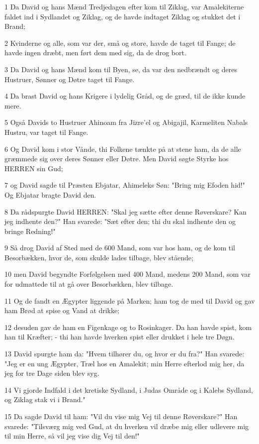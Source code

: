 \par 1 Da David og hans Mænd Tredjedagen efter kom til Ziklag, var Amalekiterne faldet ind i Sydlandet og Ziklag, og de havde indtaget Ziklag og stukket det i Brand;
\par 2 Kvinderne og alle, som var der, små og store, havde de taget til Fange; de havde ingen dræbt, men ført dem med sig, da de drog bort.
\par 3 Da David og hans Mænd kom til Byen, se, da var den nedbrændt og deres Hustruer, Sønner og Døtre taget til Fange.
\par 4 Da brast David og hans Krigere i lydelig Gråd, og de græd, til de ikke kunde mere.
\par 5 Også Davids to Hustruer Ahinoam fra Jizre'el og Abigajil, Karmeliten Nabals Hustru, var taget til Fange.
\par 6 Og David kom i stor Vånde, thi Folkene tænkte på at stene ham, da de alle græmmede sig over deres Sønner eller Døtre. Men David søgte Styrke hos HERREN sin Gud;
\par 7 og David sagde til Præsten Ebjatar, Ahimeleks Søn: "Bring mig Efoden hid!" Og Ebjatar bragte David den.
\par 8 Da rådspurgte David HERREN: "Skal jeg sætte efter denne Røverskare? Kan jeg indhente den?" Han svarede: "Sæt efter den; thi du skal indhente den og bringe Redning!"
\par 9 Så drog David af Sted med de 600 Mand, som var hos ham, og de kom til Besorbækken, hvor de, som skulde lades tilbage, blev stående;
\par 10 men David begyndte Forfølgelsen med 400 Mand, medens 200 Mand, som var for udmattede til at gå over Besorbækken, blev tilbage.
\par 11 Og de fandt en Ægypter liggende på Marken; ham tog de med til David og gav ham Brød at spise og Vand at drikke;
\par 12 desuden gav de ham en Figenkage og to Rosinkager. Da han havde spist, kom han til Kræfter; - thi han havde hverken spist eller drukket i hele tre Døgn.
\par 13 David spurgte ham da: "Hvem tilhører du, og hvor er du fra?" Han svarede: "Jeg er en ung Ægypter, Træl hos en Amalekit; min Herre efterlod mig her, da jeg for tre Dage siden blev syg.
\par 14 Vi gjorde Indfald i det kretiske Sydland, i Judas Område og i Kalebs Sydland, og Ziklag stak vi i Brand."
\par 15 Da sagde David til ham: "Vil du vise mig Vej til denne Røverskare?" Han svarede: "Tilsværg mig ved Gud, at du hverken vil dræbe mig eller udlevere mig til min Herre, så vil jeg vise dig Vej til den!"

